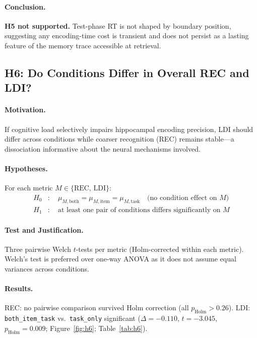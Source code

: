 \documentclass[10pt,a4paper]{article}
\begin{document}
\paragraph{Conclusion.}
\textbf{H5 not supported.} Test-phase RT is not shaped by boundary position, suggesting any encoding-time cost is transient and does not persist as a lasting feature of the memory trace accessible at retrieval.

\subsection*{H6: Do Conditions Differ in Overall REC and LDI?}

\paragraph{Motivation.}
If cognitive load selectively impairs hippocampal encoding precision, LDI should differ across conditions while coarser recognition (REC) remains stable---a dissociation informative about the neural mechanisms involved.

\paragraph{Hypotheses.}
For each metric $M \in \{\mathrm{REC},\, \mathrm{LDI}\}$:
\begin{align*}
  H_0 &:\quad \mu_{M,\mathrm{both}} = \mu_{M,\mathrm{item}} = \mu_{M,\mathrm{task}}
        \quad \text{(no condition effect on }M\text{)} \\
  H_1 &:\quad \text{at least one pair of conditions differs significantly on } M
\end{align*}

\paragraph{Test and Justification.}
Three pairwise Welch $t$-tests per metric (Holm-corrected within each metric). Welch's test is preferred over one-way ANOVA as it does not assume equal variances across conditions.

\paragraph{Results.}
REC: no pairwise comparison survived Holm correction (all $p_{\mathrm{Holm}}{>}0.26$). LDI: \texttt{both\_item\_task} vs.\ \texttt{task\_only} significant ($\Delta{=}{-}0.110$, $t{=}{-}3.045$, $p_{\mathrm{Holm}}{=}0.009$; Figure~\ref{fig:h6}; Table~\ref{tab:h6}).
\end{document}
